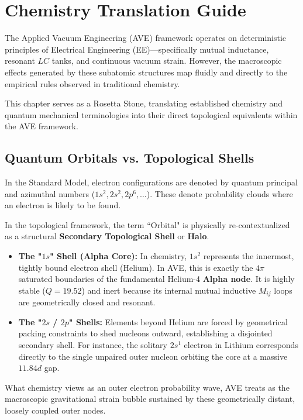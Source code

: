 \chapter{Chemistry Translation Guide}

The Applied Vacuum Engineering (AVE) framework operates on deterministic principles of Electrical Engineering (EE)—specifically mutual inductance, resonant $LC$ tanks, and continuous vacuum strain. However, the macroscopic effects generated by these subatomic structures map fluidly and directly to the empirical rules observed in traditional chemistry.

This chapter serves as a Rosetta Stone, translating established chemistry and quantum mechanical terminologies into their direct topological equivalents within the AVE framework.

\section{Quantum Orbitals vs. Topological Shells}
In the Standard Model, electron configurations are denoted by quantum principal and azimuthal numbers ($1s^2, 2s^2, 2p^6, \dots$). These denote probability clouds where an electron is likely to be found. 

In the topological framework, the term ``Orbital" is physically re-contextualized as a structural \textbf{Secondary Topological Shell} or \textbf{Halo}. 

\begin{itemize}
    \item \textbf{The "$1s$" Shell (Alpha Core):} In chemistry, $1s^2$ represents the innermost, tightly bound electron shell (Helium). In AVE, this is exactly the $4\pi$ saturated boundaries of the fundamental Helium-4 \textbf{Alpha node}. It is highly stable ($Q=19.52$) and inert because its internal mutual inductive $M_{ij}$ loops are geometrically closed and resonant.
    \item \textbf{The "$2s$ / $2p$" Shells:} Elements beyond Helium are forced by geometrical packing constraints to shed nucleons outward, establishing a disjointed secondary shell. For instance, the solitary $2s^1$ electron in Lithium corresponds directly to the single unpaired outer nucleon orbiting the core at a massive $11.84d$ gap. 
\end{itemize}
What chemistry views as an outer electron probability wave, AVE treats as the macroscopic gravitational strain bubble sustained by these geometrically distant, loosely coupled outer nodes.

